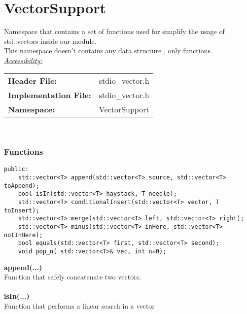 \documentclass{article}
\begin{document}
\section{VectorSupport}

Namespace that contains a set of functions used for simplify the usage of std::vectors inside our module.\\

This namespace doesn't contains any data structure , only functions.\\

\underline{\textit{\underline{Accessibility: }}}\\

\begin{tabular}{ll}
	\textbf{Header File:} & stdio\_vector.h\\
	\textbf{Implementation File:} & stdio\_vector.h\\
	\textbf{Namespace: } & VectorSupport\\
\end{tabular}\\

\subsubsection{Functions}

\begin{mdframed}[hidealllines=true, backgroundcolor=magenta!10]
	\begin{lstlisting}[basicstyle=\tiny]
public:
	std::vector<T> append(std::vector<T> source, std::vector<T> toAppend);
	bool isIn(std::vector<T> haystack, T needle);
	std::vector<T> conditionalInsert(std::vector<T> vector, T toInsert);
	std::vector<T> merge(std::vector<T> left, std::vector<T> right);
	std::vector<T> minus(std::vector<T> inHere, std::vector<T> notInHere);
	bool equals(std::vector<T> first, std::vector<T> second);
	void pop_n( std::vector<T>& vec, int n=0);
	\end{lstlisting}
\end{mdframed}

\textbf{append(...)}\\
Function that safely concatenate two vectors.\\\\

\textbf{isIn(...)}\\
Function that performs a linear search in a vector\\\\
\end{document}
